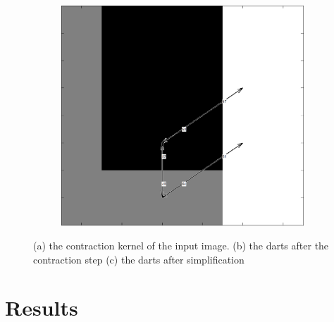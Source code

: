 \documentclass[12pt]{article}
\begin{document}
\begin{figure}[tb]
\begin{subfigure}[b]{0.3\textwidth}
      \caption{}\label{fig:dart_simply3}
    \end{subfigure}~%
    \begin{subfigure}[b]{0.3\textwidth}
      \includegraphics[width=\textwidth]{img/simply1.jpg}
      \caption{}\label{fig:dart_simply1}
    \end{subfigure}
  \caption{(a) the contraction kernel of the input image. (b) the darts after the contraction step (c) the darts after simplification}\label{fig:dart_simply}
\end{figure}



\section{Results}%
\label{sec:results}
\end{document}
